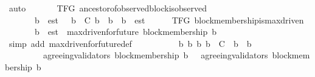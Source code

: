 \begin{isabellebody}
\ auto\isanewline
{}\isamarkupfalse%
%
\endisatagproof
{\isafoldproof}%
%
\isadelimproof
\ \ \ \ \isanewline
%
\endisadelimproof
\isanewline
{}\isamarkupfalse%
\ {\isacharparenleft}\ TFG{\isacharparenright}\ ancestor{\isacharunderscore}of{\isacharunderscore}observed{\isacharunderscore}block{\isacharunderscore}is{\isacharunderscore}observed\ {\isacharcolon}\isanewline
\ \ {\isachardoublequoteopen}{\isasymforall}\ {\isasymsigma}\ {\isasymin}\ {\isasymSigma}{\isachardot}\ {\isasymforall}\ b\ {\isasymin}\ est\ {\isacharbackquote}{\isasymsigma}{\isachardot}\ {\isasymforall}\ b{\isacharprime}\ {\isasymin}\ C{\isachardot}\ b{\isacharprime}\ {\isasymdownharpoonright}\ b\ {\isasymlongrightarrow}\ b{\isacharprime}\ {\isasymin}\ est\ {\isacharbackquote}{\isasymsigma}{\isachardoublequoteclose}\isanewline
%
\isadelimproof
\ \ %
\endisadelimproof
%
\isatagproof
{}\isamarkupfalse%
%
\endisatagproof
{\isafoldproof}%
%
\isadelimproof
\isanewline
%
\endisadelimproof
\isanewline
{}\isamarkupfalse%
\ {\isacharparenleft}\ TFG{\isacharparenright}\ block{\isacharunderscore}membership{\isacharunderscore}is{\isacharunderscore}max{\isacharunderscore}driven\ {\isacharcolon}\isanewline
\ \ {\isachardoublequoteopen}{\isasymforall}\ {\isasymsigma}\ {\isasymin}\ {\isasymSigma}{\isachardot}\ {\isasymforall}\ b\ {\isasymin}\ est\ {\isacharbackquote}{\isasymsigma}{\isachardot}\ max{\isacharunderscore}driven{\isacharunderscore}for{\isacharunderscore}future\ {\isacharparenleft}block{\isacharunderscore}membership\ b{\isacharparenright}\ {\isasymsigma}{\isachardoublequoteclose}\isanewline
%
\isadelimproof
\ \ %
\endisadelimproof
%
\isatagproof
{}\isamarkupfalse%
\ {\isacharparenleft}simp\ add{\isacharcolon}\ max{\isacharunderscore}driven{\isacharunderscore}for{\isacharunderscore}future{\isacharunderscore}def{\isacharparenright}\isanewline
{}\isamarkupfalse%
\ {\isacharminus}\isanewline
\ \ \isamarkupfalse%
\ {\isachardoublequoteopen}{\isasymforall}\ {\isasymsigma}\ {\isasymin}\ {\isasymSigma}{\isachardot}\ {\isasymforall}\ b\ b{\isacharprime}{\isachardot}\ {\isacharbraceleft}b{\isacharcomma}\ b{\isacharprime}{\isacharbraceright}\ {\isasymsubseteq}\ C\ {\isasymand}\ b{\isacharprime}\ {\isasymdownharpoonright}\ b\isanewline
\ \ \ \ \ \ \ \ {\isasymlongrightarrow}\ agreeing{\isacharunderscore}validators\ {\isacharparenleft}block{\isacharunderscore}membership\ b{\isacharcomma}\ {\isasymsigma}{\isacharparenright}\ {\isasymsubseteq}\ agreeing{\isacharunderscore}validators\ {\isacharparenleft}block{\isacharunderscore}membership\ b{\isacharprime}{\isacharcomma}\ {\isasymsigma}{\isacharparenright}{\isachardoublequoteclose}\isanewline

\end{isabellebody}
